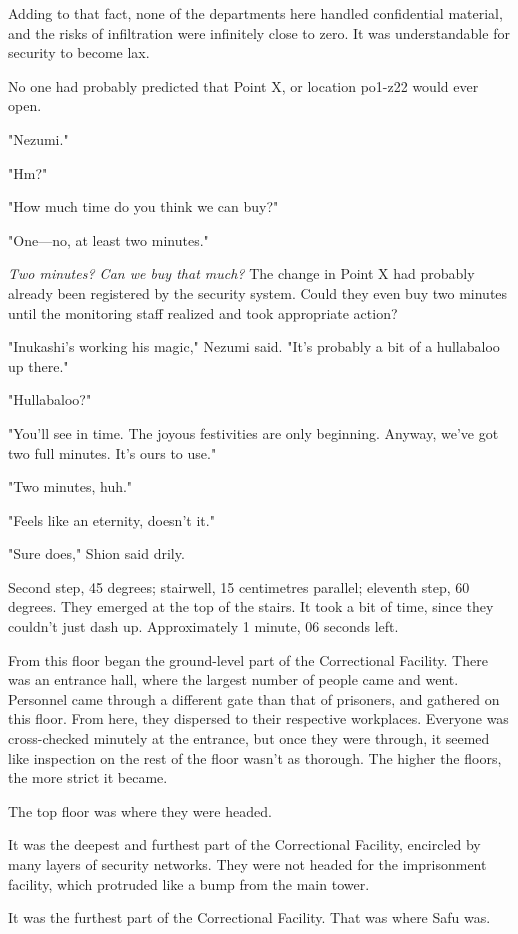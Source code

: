 Adding to that fact, none of the departments here handled confidential
material, and the risks of infiltration were infinitely close to zero.
It was understandable for security to become lax.

No one had probably predicted that Point X, or location po1-z22 would
ever open.

"Nezumi."

"Hm?"

"How much time do you think we can buy?"

"One---no, at least two minutes."

\emph{Two minutes? Can we buy that much?} The change in Point X had probably
already been registered by the security system. Could they even buy two
minutes until the monitoring staff realized and took appropriate action?

"Inukashi's working his magic," Nezumi said. "It's probably a bit of a
hullabaloo up there."

"Hullabaloo?"

"You'll see in time. The joyous festivities are only beginning. Anyway,
we've got two full minutes. It's ours to use."

"Two minutes, huh."

"Feels like an eternity, doesn't it."

"Sure does," Shion said drily.

Second step, 45 degrees; stairwell, 15 centimetres parallel; eleventh
step, 60 degrees. They emerged at the top of the stairs. It took a bit
of time, since they couldn't just dash up. Approximately 1 minute, 06
seconds left.

From this floor began the ground-level part of the Correctional
Facility. There was an entrance hall, where the largest number of people
came and went. Personnel came through a different gate than that of
prisoners, and gathered on this floor. From here, they dispersed to
their respective workplaces. Everyone was cross-checked minutely at the
entrance, but once they were through, it seemed like inspection on the
rest of the floor wasn't as thorough. The higher the floors, the more
strict it became.

The top floor was where they were headed.

It was the deepest and furthest part of the Correctional Facility,
encircled by many layers of security networks. They were not headed for
the imprisonment facility, which protruded like a bump from the main
tower.

It was the furthest part of the Correctional Facility. That was where
Safu was.

